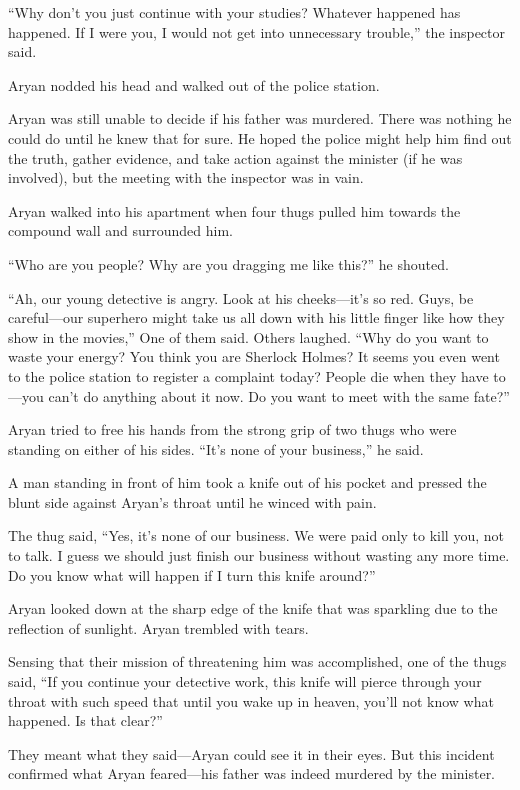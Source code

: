 “Why don't you just continue with your studies? Whatever happened has happened.
If I were you, I would not get into unnecessary trouble,” the inspector said.

Aryan nodded his head and walked out of the police station.

Aryan was still unable to decide if his father was murdered. There was nothing
he could do until he knew that for sure. He hoped the police might help him find
out the truth, gather evidence, and take action against the minister (if he was
involved), but the meeting with the inspector was in vain.

Aryan walked into his apartment when four thugs pulled him towards the compound
wall and surrounded him.

“Who are you people? Why are you dragging me like this?” he shouted.

“Ah, our young detective is angry. Look at his cheeks—it's so red. Guys, be
careful—our superhero might take us all down with his little finger like how
they show in the movies,” One of them said. Others laughed. “Why do you want to
waste your energy? You think you are Sherlock Holmes? It seems you even went to
the police station to register a complaint today? People die when they have
to—you can't do anything about it now. Do you want to meet with the same fate?”

Aryan tried to free his hands from the strong grip of two thugs who were
standing on either of his sides. “It's none of your business,” he said.

A man standing in front of him took a knife out of his pocket and pressed the
blunt side against Aryan's throat until he winced with pain.

The thug said, “Yes, it's none of our business. We were paid only to kill you,
not to talk. I guess we should just finish our business without wasting any more
time. Do you know what will happen if I turn this knife around?”

Aryan looked down at the sharp edge of the knife that was sparkling due to the
reflection of sunlight. Aryan trembled with tears.

Sensing that their mission of threatening him was accomplished, one of the thugs
said, “If you continue your detective work, this knife will pierce through your
throat with such speed that until you wake up in heaven, you'll not know what
happened. Is that clear?”

They meant what they said—Aryan could see it in their eyes. But this incident
confirmed what Aryan feared—his father was indeed murdered by the minister.